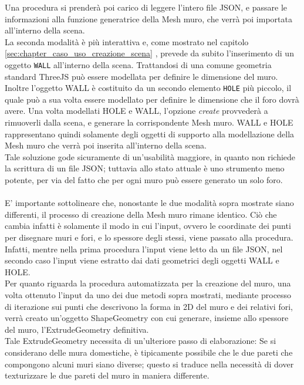 Una procedura si prenderà poi carico di leggere l’intero file JSON, e passare le informazioni alla funzione generatrice della Mesh muro, che verrà poi importata all’interno della scena.
\\
La seconda modalità è più interattiva e, come mostrato nel capitolo \ref{sec:chapter_caso_uso_creazione_scena} , prevede da subito l’inserimento di un oggetto \texttt{WALL} all’interno della scena. Trattandosi di una comune geometria standard ThreeJS può essere modellata per definire le dimensione del muro. Inoltre l’oggetto WALL è costituito da un secondo elemento \texttt{HOLE} più piccolo, il quale può a sua volta essere modellato per definire le dimensione che il foro dovrà avere. Una volta modellati HOLE e WALL, l’opzione \emph{create} provvederà a rimuoverli dalla scena, e generare la corrispondente Mesh muro. WALL e HOLE rappresentano quindi solamente degli oggetti di supporto alla modellazione della Mesh muro che verrà poi inserita all’interno della scena.
\\
Tale soluzione gode sicuramente di un’usabilità maggiore, in quanto non richiede la scrittura di un file JSON; tuttavia allo stato attuale è uno strumento meno potente, per via del fatto che per ogni muro può essere generato un solo foro. 
\\
\\
E’ importante sottolineare che, nonostante le due modalità sopra mostrate siano differenti, il processo di creazione della Mesh muro rimane identico. Ciò che cambia infatti è solamente il modo in cui l’input, ovvero le coordinate dei punti per disegnare muri e fori, e lo spessore degli stessi, viene passato alla procedura. Infatti, mentre nella prima procedura l’input viene letto da un file JSON, nel secondo caso l’input viene estratto dai dati geometrici degli oggetti WALL e HOLE.
\\ 
Per quanto riguarda la procedura automatizzata per la creazione del muro, una volta ottenuto l’input da uno dei due metodi sopra mostrati, mediante processo di iterazione sui punti che descrivono la forma in 2D del muro e dei relativi fori, verrà creato un’oggetto ShapeGeometry con cui generare, insieme allo spessore del muro, l’ExtrudeGeometry definitiva.
\\ 
Tale ExtrudeGeometry necessita di un’ulteriore passo di elaborazione:
Se si considerano delle mura domestiche, è tipicamente possibile che le due pareti che compongono alcuni muri siano diverse; questo si traduce nella necessità di dover texturizzare le due pareti del muro in maniera differente.
